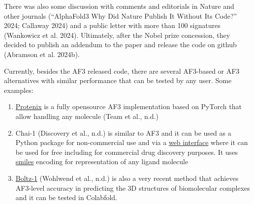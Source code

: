 \documentclass[
]{scrbook}
\begin{document}
\begin{centering}\begin{tcolorbox}[hbox,
colframe=lightgray,
colback=white]

\textcolor{ProcessBlue}{{\Large {\faTwitterSquare}}} %

\href{https://twitter.com/simocristea/status/1788515833884389806}{}

\end{tcolorbox}\end{centering}
\vspace{1em}

\begin{centering}\begin{tcolorbox}[hbox,
colframe=lightgray,
colback=white]

\textcolor{ProcessBlue}{{\Large {\faTwitterSquare}}} %

\href{https://twitter.com/simocristea/status/1788515833884389806}{}

\end{tcolorbox}\end{centering}
\vspace{1em}

There was also some discussion with comments and editorials in Nature
and other journals ({``AlphaFold3 {\textemdash} Why Did Nature Publish
It Without Its Code?''} 2024; Callaway 2024) and a public letter with
more than 100 signatures (Wankowicz et al. 2024). Ultimately, after the
Nobel prize concession, they decided to publish an addendum to the paper
and release the code on github (Abramson et al. 2024b).

Currently, besides the AF3 released code, there are several AF3-based or
AF3 alternatives with similar performance that can be tested by any
user. Some examples:

\begin{enumerate}
\def\labelenumi{\arabic{enumi}.}
\item
  \href{https://github.com/bytedance/Protenix}{Protenix} is a fully
  opensource AF3 implementation based on PyTorch that allow handling any
  molecule (Team et al., n.d.)
\item
  Chai-1 (Discovery et al., n.d.) is similar to AF3 and it can be used
  as a Python package for non-commercial use and via a
  \href{https://lab.chaidiscovery.com/}{web interface} where it can be
  used for free including for commercial drug discovery purposes. It
  uses
  \href{https://en.wikipedia.org/wiki/Simplified_Molecular_Input_Line_Entry_System}{smiles}
  encoding for representation of any ligand molecule
\item
  \href{https://github.com/jwohlwend/boltz}{Boltz-1} (Wohlwend et al.,
  n.d.) is also a very recent method that achieves AF3-level accuracy in
  predicting the 3D structures of biomolecular complexes and it can be
  tested in Colabfold.
\end{enumerate}
\end{document}
